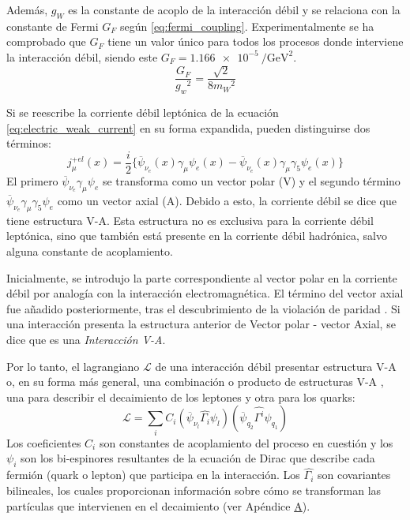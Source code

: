 Además, $g_W$ es la constante de acoplo de la interacción débil y se relaciona con la constante de Fermi $G_F$ según \ref{eq:fermi_coupling}. Experimentalmente se ha comprobado que $G_F$ tiene un valor único para todos los procesos donde interviene la interacción débil, siendo este $G_{F}= \SI{1,166e-5}{\per\GeV\squared}$.
\begin{equation}
\dfrac{G_{F}}{{g_{w}}^2}=\dfrac{\sqrt{2}}{8{m_{W}}^2}\label{eq:fermi_coupling}
\end{equation}

Si se reescribe la corriente débil leptónica de la ecuación \ref{eq:electric_weak_current} en su forma expandida, pueden distinguirse dos términos:
\begin{equation}
j_{\mu}^{+el}\left(x\right)= \dfrac{i}{2} \{ \overline{\psi}_{{\nu}_{e}}\left(x\right)\gamma _{\mu}\psi_{e}\left( x\right)- \overline{\psi}_{{\nu}_{e}}\left(x\right)\gamma _{\mu}\gamma_{5}\psi_{e}\left( x\right) \}
\end{equation}
El primero $\overline{\psi}_{{\nu}_{e}}\gamma _{\mu}\psi_{e}$ se transforma como un vector polar (V) y el segundo término $\overline{\psi}_{{\nu}_{e}}\gamma _{\mu}\gamma_{5}\psi_{e}$ como un vector axial (A). Debido a esto, la corriente débil se dice que tiene estructura V-A. Esta estructura no es exclusiva para la corriente débil leptónica, sino que también está presente en la corriente débil hadrónica, salvo alguna constante de acoplamiento. 

Inicialmente, se introdujo la parte correspondiente al vector polar en la corriente débil por analogía con la interacción electromagnética. El término del vector axial fue añadido posteriormente, tras el descubrimiento de la violación de paridad \cite{Paschos}. Si una interacción presenta la estructura anterior de Vector polar - vector Axial, se dice que es una \textit{Interacción V-A}.

Por lo tanto, el lagrangiano $\mathcal{L}$ de una interacción débil presentar estructura V-A o, en su forma más general, una combinación o producto de estructuras V-A \cite{Renton}, una para describir el decaimiento de los leptones y otra para los quarks:
\begin{equation}
\mathcal{L}= \sum _{i} C_{i}\left(\overline{\psi}_{\nu_l}\widehat{\Gamma_{i}}\psi _{l}\right)\left( \overline{\psi }_{q_2}\widehat{\Gamma^{i}}\psi _{q_1}\right)
\end{equation}
Los coeficientes $C_i$ son constantes de acoplamiento del proceso en cuestión y los $\psi_i$ son los bi-espinores resultantes de la ecuación de Dirac que describe cada fermión (quark o lepton) que participa en la interacción. Los $\widehat{\Gamma_{i}}$ son covariantes bilineales, los cuales proporcionan información sobre cómo se transforman las partículas que intervienen en el decaimiento (ver Apéndice \hyperref[cap:A]{A}).

